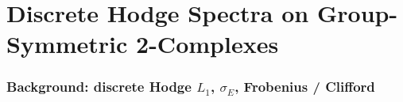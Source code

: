 \documentclass[12pt,a4paper]{article}
\theoremstyle{definition}
\theoremstyle{remark}
\newcommand{\bZ}{\mathbb{Z}}
\newcommand{\bQ}{\mathbb{Q}}                %
\begin{document}
%

\part{Discrete Hodge Spectra on Group-Symmetric 2-Complexes}

\section{Background: discrete Hodge $L_1$, $\sigma_E$, Frobenius / Clifford}\label{sec:dh-background}
\end{document}
